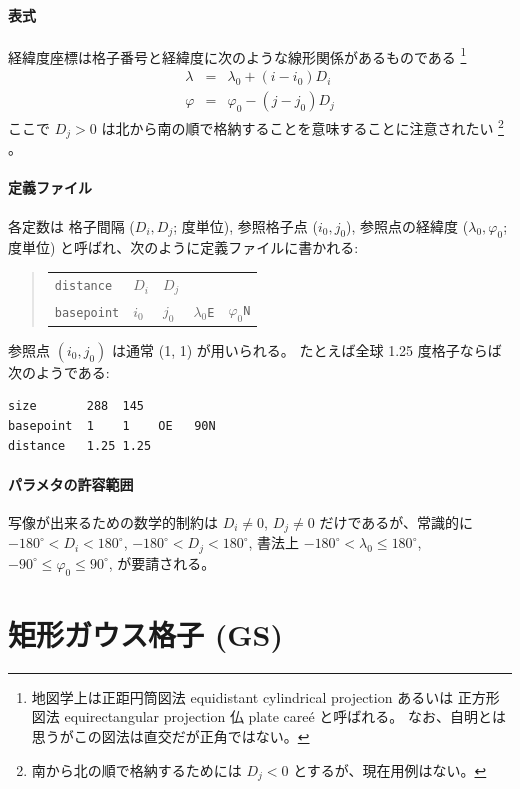 \paragraph{表式}
経緯度座標は格子番号と経緯度に次のような線形関係があるものである%
\footnote{
地図学上は正距円筒図法 equidistant cylindrical projection あるいは
正方形図法 equirectangular projection 仏 plate care\'e と呼ばれる。
なお、自明とは思うがこの図法は直交だが正角ではない。
}
\begin{eqnarray}
 \lambda &=& \lambda_0 + (i - i_0) D_i
\\
 \varphi &=& \varphi_0 - (j - j_0) D_j
\end{eqnarray}
ここで $D_j > 0$ は北から南の順で格納することを意味することに注意されたい%
\footnote{南から北の順で格納するためには $D_j < 0$ とするが、現在用例はない。}%
。

\paragraph{定義ファイル}
各定数は
格子間隔 ($D_i, D_j$; 度単位), 参照格子点 ($i_0, j_0$),
参照点の経緯度 ($\lambda_0, \varphi_0$; 度単位)
と呼ばれ、次のように定義ファイルに書かれる:
\begin{quote}
\begin{tabular}{lllll}
{\tt distance}	& $D_i$ & $D_j$ & & \\
{\tt basepoint}	& $i_0$ & $j_0$	& $\lambda_0${\tt E} & $\varphi_0${\tt N} \\
\end{tabular}
\end{quote}
参照点 $(i_0, j_0)$ は通常 (1, 1) が用いられる。
たとえば全球 1.25 度格子ならば次のようである:
\begin{screen}
\begin{verbatim}
size       288  145
basepoint  1    1    OE   90N
distance   1.25 1.25
\end{verbatim}
\end{screen}

\paragraph{パラメタの許容範囲}
写像が出来るための数学的制約は
\( D_i \ne 0 \),
\( D_j \ne 0 \)
だけであるが、常識的に
\( -180^\circ < D_i < 180^\circ \),
\( -180^\circ < D_j < 180^\circ \),
書法上
\( -180^\circ < \lambda_0 \le 180^\circ \),
\( -90^\circ \le \varphi_0 \le 90^\circ \),
が要請される。

\section{矩形ガウス格子 (GS)}

